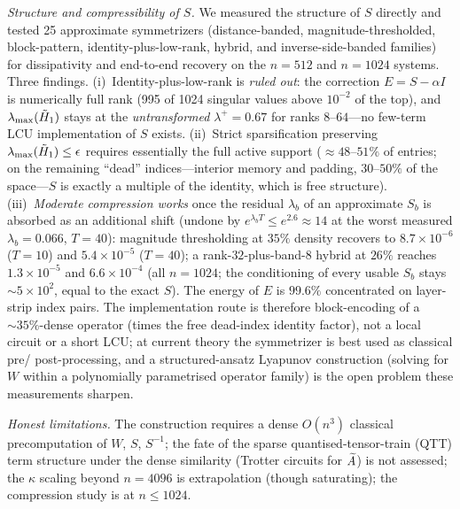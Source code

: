 \emph{Structure and compressibility of $S$.}  We measured the structure
of $S$ directly and tested 25 approximate symmetrizers (distance-banded,
magnitude-thresholded, block-pattern, identity-plus-low-rank, hybrid,
and inverse-side-banded families) for dissipativity and end-to-end
recovery on the $n=512$ and $n=1024$ systems.  Three findings.
(i)~Identity-plus-low-rank is \emph{ruled out}: the correction
$E=S-\alpha I$ is numerically full rank (995 of 1024 singular values
above $10^{-2}$ of the top), and $\lambda_{\max}(\tilde H_1)$ stays at the
\emph{untransformed} $\lambda^{+}=0.67$ for ranks $8$--$64$---no
few-term LCU implementation of $S$ exists.  (ii)~Strict sparsification
preserving $\lambda_{\max}(\tilde H_1)\le\epsilon$ requires essentially the
full active support ($\approx48$--$51\%$ of entries; on the remaining
``dead'' indices---interior memory and padding, $30$--$50\%$ of the
space---$S$ is exactly a multiple of the identity, which is free
structure).  (iii)~\emph{Moderate compression works} once the residual
$\lambda_b$ of an approximate $S_b$ is absorbed as an additional shift
(undone by $e^{\lambda_b T}\le e^{2.6}\approx14$ at the worst measured
$\lambda_b=0.066$, $T=40$): magnitude thresholding at $35\%$ density
recovers to $8.7\times10^{-6}$ ($T=10$) and $5.4\times10^{-5}$
($T=40$); a rank-$32$-plus-band-$8$ hybrid at $26\%$ reaches
$1.3\times10^{-5}$ and $6.6\times10^{-4}$ (all $n=1024$; the
conditioning of every usable $S_b$ stays ${\sim}5\times10^{2}$, equal
to the exact $S$).  The energy of $E$ is $99.6\%$ concentrated on
layer-strip index pairs.  The implementation route is therefore
block-encoding of a ${\sim}35\%$-dense operator (times the free
dead-index identity factor), not a local circuit or a short LCU; at
current theory the symmetrizer is best used as classical pre/\allowbreak
post-processing, and a structured-ansatz Lyapunov construction (solving
for $W$ within a polynomially parametrised operator family) is the open
problem these measurements sharpen.

\emph{Honest limitations.}  The construction requires a dense $O(n^{3})$
classical precomputation of $W$, $S$, $S^{-1}$; the fate of the sparse
quantised-tensor-train (QTT) term structure under the dense similarity
(Trotter circuits for $\widetilde{A}$) is not assessed; the $\kappa$ scaling
beyond $n=4096$ is extrapolation (though saturating); the compression
study is at $n\le1024$.

